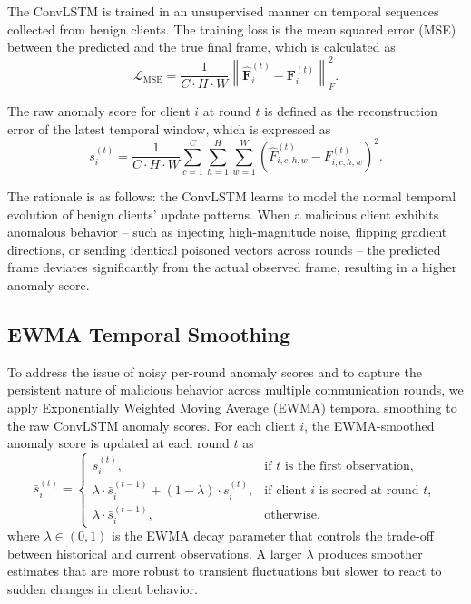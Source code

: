 The ConvLSTM is trained in an unsupervised manner on temporal sequences collected from benign clients. The training loss is the mean squared error (MSE) between the predicted and the true final frame, which is calculated as
\begin{equation}\label{eq:train_loss}
    \mathcal{L}_{\text{MSE}} = \frac{1}{C \cdot H \cdot W} \left\| \hat{\mathbf{F}}_i^{(t)} - \mathbf{F}_i^{(t)} \right\|_F^2.
\end{equation}

The raw anomaly score for client $i$ at round $t$ is defined as the reconstruction error of the latest temporal window, which is expressed as
\begin{equation}\label{eq:anom_score}
    s_i^{(t)} = \frac{1}{C \cdot H \cdot W} \sum_{c=1}^{C} \sum_{h=1}^{H} \sum_{w=1}^{W} \left(\hat{F}_{i,c,h,w}^{(t)} - F_{i,c,h,w}^{(t)}\right)^2.
\end{equation}

The rationale is as follows: the ConvLSTM learns to model the normal temporal evolution of benign clients' update patterns. When a malicious client exhibits anomalous behavior -- such as injecting high-magnitude noise, flipping gradient directions, or sending identical poisoned vectors across rounds -- the predicted frame deviates significantly from the actual observed frame, resulting in a higher anomaly score.

\subsection{EWMA Temporal Smoothing}\label{subsec:ewma}

To address the issue of noisy per-round anomaly scores and to capture the persistent nature of malicious behavior across multiple communication rounds, we apply Exponentially Weighted Moving Average (EWMA) temporal smoothing to the raw ConvLSTM anomaly scores. For each client $i$, the EWMA-smoothed anomaly score is updated at each round $t$ as
\begin{equation}\label{eq:ewma}
    \bar{s}_i^{(t)} =
    \begin{cases}
        s_i^{(t)}, & \text{if } t \text{ is the first observation}, \\
        \lambda \cdot \bar{s}_i^{(t-1)} + (1 - \lambda) \cdot s_i^{(t)}, & \text{if client } i \text{ is scored at round } t, \\
        \lambda \cdot \bar{s}_i^{(t-1)}, & \text{otherwise},
    \end{cases}
\end{equation}
where $\lambda \in (0, 1)$ is the EWMA decay parameter that controls the trade-off between historical and current observations. A larger $\lambda$ produces smoother estimates that are more robust to transient fluctuations but slower to react to sudden changes in client behavior.


